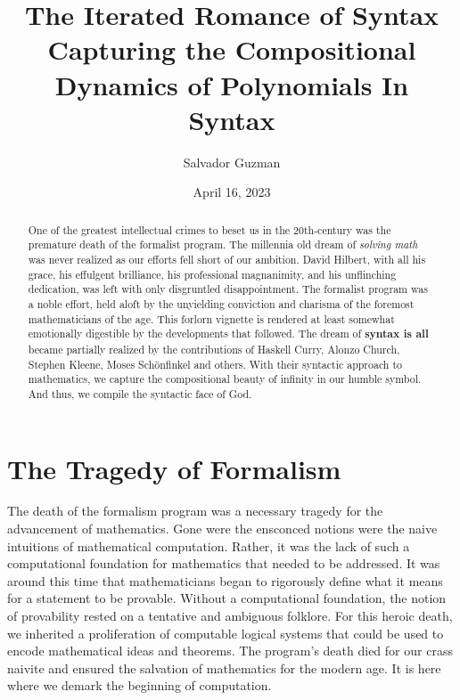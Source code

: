 \documentclass[12pt]{article}
\title{
 The Iterated Romance of Syntax \\
 \large Capturing the Compositional Dynamics of Polynomials In Syntax}
\author{Salvador Guzman}
\date{April 16, 2023}
\begin{document}
\maketitle
\pagebreak

\begin{abstract}
    One of the greatest intellectual crimes to beset us in the 20th-century was
    the premature death of the formalist program. The millennia old dream of
    \textit{solving math} was never realized as our efforts fell short of our
    ambition. David Hilbert, with all his grace, his effulgent brilliance, his
    professional magnanimity, and his unflinching dedication, was left with only
    disgruntled disappointment. The formalist program was a noble effort, held
    aloft by the unyielding conviction and charisma of the foremost
    mathematicians of the age. This forlorn vignette is rendered at least
    somewhat emotionally digestible by the developments that followed. The dream
    of \textbf{syntax is all} became partially realized by the contributions of Haskell
    Curry, Alonzo Church, Stephen Kleene, Moses Schönfinkel and others. With
    their syntactic approach to mathematics, we capture the compositional beauty
    of infinity in our humble symbol. And thus, we compile the syntactic face of God.
\end{abstract}
\pagebreak
\tableofcontents
\pagebreak

\section{The Tragedy of Formalism}
The death of the formalism program was a necessary tragedy for the advancement
of mathematics. Gone were the ensconced notions were the naive intuitions of
mathematical computation. Rather, it was the lack of such a computational
foundation for mathematics that needed to be addressed. It was around this time
that mathematicians began to rigorously define what it means for a statement to
be provable. Without a computational foundation, the notion of provability
rested on a tentative and ambiguous folklore. For this heroic death, we
inherited a proliferation of computable logical systems that could be used to
encode mathematical ideas and theorems. The program's death died for our crass
naivite and ensured the salvation of mathematics for the modern age. It is here
where we demark the beginning of computation.
\end{document}
